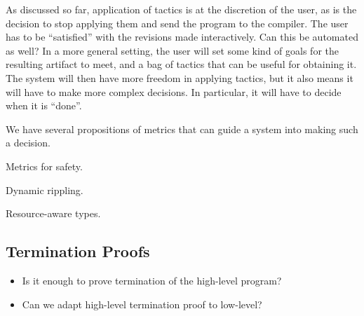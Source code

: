 As discussed so far, application of tactics is at the discretion of the
user, as is the decision to stop applying them and send the program to
the compiler.
The user has to be ``satisfied'' with the revisions made interactively.
Can this be automated as well?
In a more general setting, the user will set some kind of goals for the
resulting artifact to meet, and a bag of tactics that can be useful for
obtaining it.
The system will then have more freedom in applying tactics, but it also
means it will have to make more complex decisions.
In particular, it will have to decide when it is ``done''.

We have several propositions of metrics that can guide a system into
making such a decision.

\begin{paragraph}{Metrics for safety.} ~ \cite{MLCS1994/Avron}
\end{paragraph}

\begin{paragraph}{Dynamic rippling.} ~ \cite{Festschrift2017/JohanssonDB10}
\end{paragraph}

\begin{paragraph}{Resource-aware types.} ~ \cite{CAV2012/Hoffman}
\end{paragraph}

\subsection{Termination Proofs}

\begin{itemize}
  \item Is it enough to prove termination of the high-level program?
  \item Can we adapt high-level termination proof to low-level?
\end{itemize}
